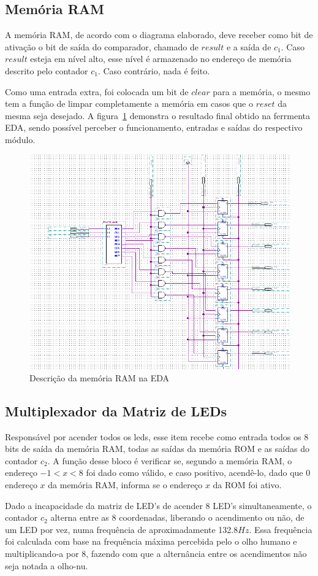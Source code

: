 \documentclass[12pt]{article}
\begin{document}
\subsection{Memória RAM}
A memória RAM, de acordo com o diagrama elaborado, deve receber como bit de ativação o bit de saída do comparador, chamado de $result$ e a saída de $c_{1}$. Caso $result$ esteja em nível alto, esse nível é armazenado no endereço de memória descrito pelo contador $c_{1}$. Caso contrário, nada é feito.

Como uma entrada extra, foi colocada um bit de $clear$ para a memória, o mesmo tem a função de limpar completamente a memória em casos que o $reset$ da mesma seja desejado. A figura~\ref{fig:ram-eda} demonstra o resultado final obtido na ferrmenta EDA, sendo possível perceber o funcionamento, entradas e saídas do respectivo módulo.

\begin{figure}[!htbp]
\centering
\includegraphics[width=.6\textwidth]{img/ram-eda.png}
\caption{Descrição da memória RAM na EDA}
\label{fig:ram-eda}
\end{figure}

\subsection{Multiplexador da Matriz de LEDs}
Responsável por acender todos os leds, esse item recebe como entrada todos os 8 bits de saída da memória RAM, todas as saídas da memória ROM e as saídas do contador $c_{2}$. A função desse bloco é verificar se, segundo a memória RAM, o endereço $-1<x<8$ foi dado como válido, e caso positivo, acendê-lo, dado que 0 endereço $x$ da memória RAM, informa se o endereço $x$ da ROM foi ativo.

Dado a incapacidade da matriz de LED's de acender 8 LED's simultaneamente, o contador $c_{2}$ alterna entre as 8 coordenadas, liberando o acendimento ou não, de um LED por vez, numa frequência de aproximadamente 132.8$Hz$. Essa frequência foi calculada com base na frequência máxima percebida pelo o olho humano e multiplicando-a por 8, fazendo com que a alternância entre os acendimentos não seja notada a olho-nu.
\end{document}
